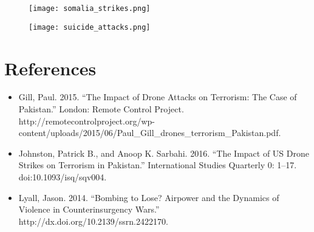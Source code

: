 \documentclass{beamer}
\begin{document}
  \begin{frame}
	\begin{figure}[h!]
		\texttt{[image: somalia\_strikes.png]}
	\end{figure}
  \end{frame}

 \begin{frame}
	\begin{figure}[h!]
		\texttt{[image: suicide\_attacks.png]}
	\end{figure}
  \end{frame}

\section{References}

 \begin{frame}
    \begin{itemize}
	\item Gill, Paul. 2015. “The Impact of Drone Attacks on Terrorism: The Case of Pakistan.” London: Remote Control Project. http://remotecontrolproject.org/wp-content/uploads/2015/06/Paul\_Gill\_drones\_terrorism\_Pakistan.pdf.
	\item Johnston, Patrick B., and Anoop K. Sarbahi. 2016. “The Impact of US Drone Strikes on Terrorism in Pakistan.” International Studies Quarterly 0: 1–17. doi:10.1093/isq/sqv004.
        \item Lyall, Jason. 2014. “Bombing to Lose? Airpower and the Dynamics of Violence in Counterinsurgency Wars.” http://dx.doi.org/10.2139/ssrn.2422170.
     \end{itemize}
  \end{frame}
\end{document}
